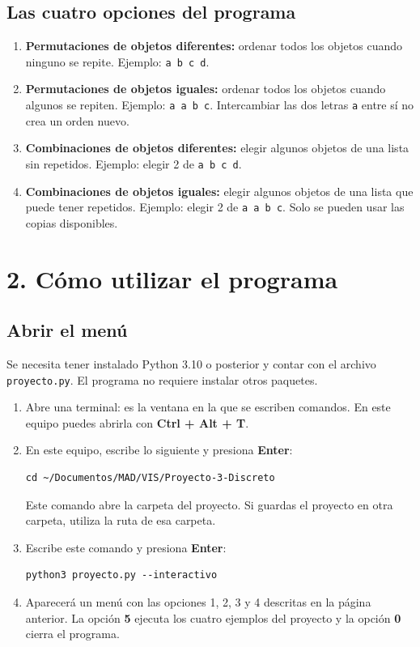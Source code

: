 \documentclass[11pt,a4paper]{article}
\begin{document}
\subsection*{Las cuatro opciones del programa}
\begin{enumerate}
\item \textbf{Permutaciones de objetos diferentes:} ordenar todos los
objetos cuando ninguno se repite. Ejemplo: \texttt{a b c d}.
\item \textbf{Permutaciones de objetos iguales:} ordenar todos los objetos
cuando algunos se repiten. Ejemplo: \texttt{a a b c}. Intercambiar las dos
letras \texttt{a} entre sí no crea un orden nuevo.
\item \textbf{Combinaciones de objetos diferentes:} elegir algunos objetos
de una lista sin repetidos. Ejemplo: elegir 2 de \texttt{a b c d}.
\item \textbf{Combinaciones de objetos iguales:} elegir algunos objetos
de una lista que puede tener repetidos. Ejemplo: elegir 2 de
\texttt{a a b c}. Solo se pueden usar las copias disponibles.
\end{enumerate}

\newpage
\section*{2. Cómo utilizar el programa}
\subsection*{Abrir el menú}
Se necesita tener instalado Python 3.10 o posterior y contar con el archivo
\texttt{proyecto.py}. El programa no requiere instalar otros paquetes.

\begin{enumerate}
\item Abre una terminal: es la ventana en la que se escriben comandos.
En este equipo puedes abrirla con \textbf{Ctrl + Alt + T}.
\item En este equipo, escribe lo siguiente y presiona \textbf{Enter}:
\begin{verbatim}
cd ~/Documentos/MAD/VIS/Proyecto-3-Discreto
\end{verbatim}
Este comando abre la carpeta del proyecto. Si guardas el proyecto en otra
carpeta, utiliza la ruta de esa carpeta.
\item Escribe este comando y presiona \textbf{Enter}:
\begin{verbatim}
python3 proyecto.py --interactivo
\end{verbatim}
\item Aparecerá un menú con las opciones 1, 2, 3 y 4 descritas en la página
anterior. La opción \textbf{5} ejecuta los cuatro ejemplos del proyecto y
la opción \textbf{0} cierra el programa.
\end{enumerate}
\end{document}
